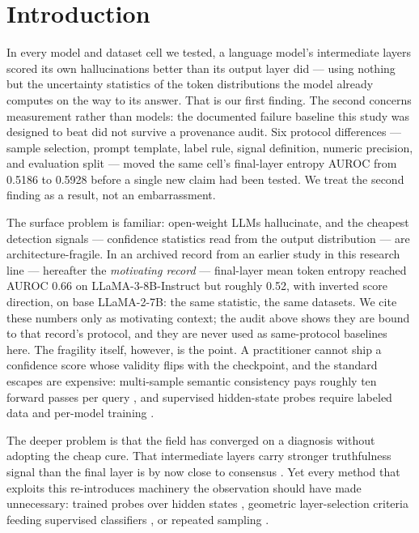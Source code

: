 \section{Introduction}
\label{sec:intro}

In every model and dataset cell we tested, a language model's intermediate layers scored its own hallucinations better than its output layer did --- using nothing but the uncertainty statistics of the token distributions the model already computes on the way to its answer. That is our first finding. The second concerns measurement rather than models: the documented failure baseline this study was designed to beat did not survive a provenance audit. Six protocol differences --- sample selection, prompt template, label rule, signal definition, numeric precision, and evaluation split --- moved the same cell's final-layer entropy AUROC from 0.5186 to 0.5928 before a single new claim had been tested. We treat the second finding as a result, not an embarrassment.

The surface problem is familiar: open-weight LLMs hallucinate, and the cheapest detection signals --- confidence statistics read from the output distribution --- are architecture-fragile. In an archived record from an earlier study in this research line --- hereafter the \emph{motivating record} --- final-layer mean token entropy reached AUROC 0.66 on LLaMA-3-8B-Instruct but roughly 0.52, with inverted score direction, on base LLaMA-2-7B: the same statistic, the same datasets. We cite these numbers only as motivating context; the audit above shows they are bound to that record's protocol, and they are never used as same-protocol baselines here. The fragility itself, however, is the point. A practitioner cannot ship a confidence score whose validity flips with the checkpoint, and the standard escapes are expensive: multi-sample semantic consistency pays roughly ten forward passes per query \citep{Farquhar2024Detecting}, and supervised hidden-state probes require labeled data and per-model training \citep{Azaria2023Internal}.

The deeper problem is that the field has converged on a diagnosis without adopting the cheap cure. That intermediate layers carry stronger truthfulness signal than the final layer is by now close to consensus \citep{Orgad2024LLMs,Wang2026Automatic}. Yet every method that exploits this re-introduces machinery the observation should have made unnecessary: trained probes over hidden states \citep{Azaria2023Internal,Suresh2025Cross}, geometric layer-selection criteria feeding supervised classifiers \citep{Wang2026Automatic}, or repeated sampling \citep{Chen2024INSIDE}.

